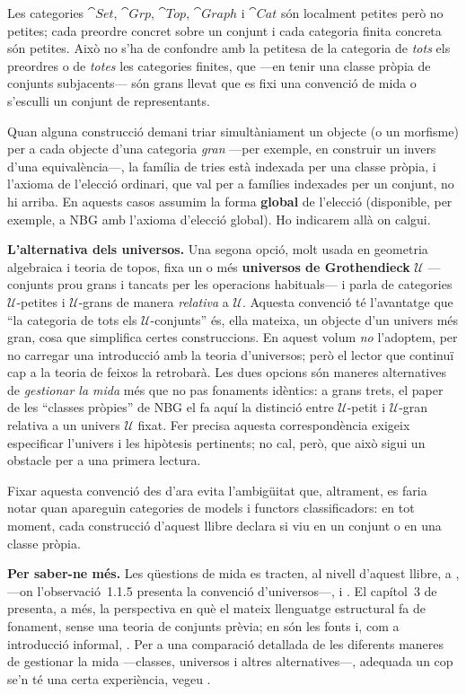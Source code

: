 Les categories $\cat{Set}$, $\cat{Grp}$, $\cat{Top}$, $\cat{Graph}$ i $\cat{Cat}$ són localment petites però no petites; cada preordre concret sobre un conjunt i cada categoria finita concreta són petites. Això no s'ha de confondre amb la petitesa de la categoria de \emph{tots} els preordres o de \emph{totes} les categories finites, que ---en tenir una classe pròpia de conjunts subjacents--- són grans llevat que es fixi una convenció de mida o s'esculli un conjunt de representants.

Quan alguna construcció demani triar simultàniament un objecte (o un morfisme) per a cada objecte d'una categoria \emph{gran} ---per exemple, en construir un invers d'una equivalència---, la família de tries està indexada per una classe pròpia, i l'axioma de l'elecció ordinari, que val per a famílies indexades per un conjunt, no hi arriba. En aquests casos assumim la forma \textbf{global} de l'elecció (disponible, per exemple, a NBG amb l'axioma d'elecció global). Ho indicarem allà on calgui.

\medskip
\noindent\textbf{L'alternativa dels universos.} Una segona opció, molt usada en geometria algebraica i teoria de topos, fixa un o més \textbf{universos de Grothendieck} $\mathcal{U}$ ---conjunts prou grans i tancats per les operacions habituals--- i parla de categories $\mathcal{U}$-petites i $\mathcal{U}$-grans de manera \emph{relativa} a $\mathcal{U}$. Aquesta convenció té l'avantatge que \enquote{la categoria de tots els $\mathcal{U}$-conjunts} és, ella mateixa, un objecte d'un univers més gran, cosa que simplifica certes construccions. En aquest volum \emph{no} l'adoptem, per no carregar una introducció amb la teoria d'universos; però el lector que continuï cap a la teoria de feixos la retrobarà. Les dues opcions són maneres alternatives de \emph{gestionar la mida} més que no pas fonaments idèntics: a grans trets, el paper de les \enquote{classes pròpies} de NBG el fa aquí la distinció entre $\mathcal{U}$-petit i $\mathcal{U}$-gran relativa a un univers $\mathcal{U}$ fixat. Fer precisa aquesta correspondència exigeix especificar l'univers i les hipòtesis pertinents; no cal, però, que això sigui un obstacle per a una primera lectura.

\medskip
\noindent Fixar aquesta convenció des d'ara evita l'ambigüitat que, altrament, es faria notar quan apareguin categories de models i functors classificadors: en tot moment, cada construcció d'aquest llibre declara si viu en un conjunt o en una classe pròpia.

\medskip
\noindent\textbf{Per saber-ne més.} Les qüestions de mida es tracten, al nivell d'aquest llibre, a \cite[§1.8]{awodey}, \cite[§1.1]{riehl} ---on l'observació~1.1.5 presenta la convenció d'universos---, \cite[§3.2]{leinster} i \cite[cap.~1]{perrone}. El capítol~3 de \cite{leinster} presenta, a més, la perspectiva en què el mateix llenguatge estructural fa de fonament, sense una teoria de conjunts prèvia; en són les fonts \cite{lawvere-etcs} i, com a introducció informal, \cite{leinster-rethinking}. Per a una comparació detallada de les diferents maneres de gestionar la mida ---classes, universos i altres alternatives---, adequada un cop se'n té una certa experiència, vegeu \cite{shulman-mida}.
